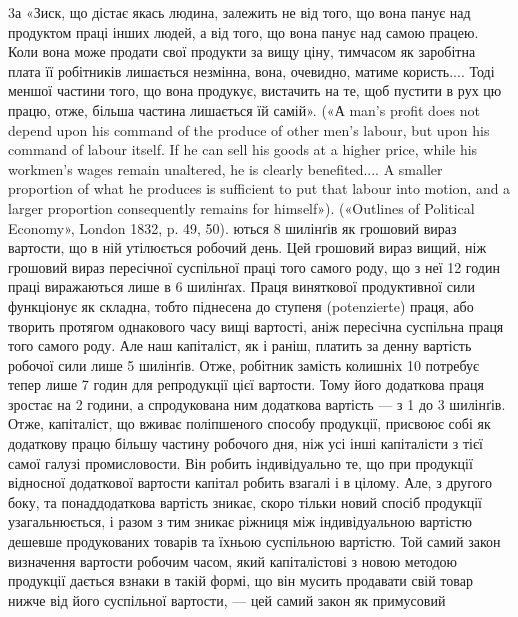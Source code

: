 3а «Зиск, що дістає якась людина, залежить не від того, що вона
панує над продуктом праці інших людей, а від того, що вона панує над
самою працею. Коли вона може продати свої продукти за вищу ціну, тимчасом
як заробітна плата її робітників лишається незмінна, вона, очевидно,
матиме користь.... Тоді меншої частини того, що вона продукує, вистачить
на те, щоб пустити в рух цю працю, отже, більша частина лишається їй
самій». («А man’s profit does not depend upon his command of the produce
of other men’s labour, but upon his command of labour itself. If he can sell
his goods at a higher price, while his workmen's wages remain unaltered,
he is clearly benefited.... A smaller proportion of what he produces is sufficient
to put that labour into motion, and a larger proportion consequently
remains for himself»). («Outlines of Political Economy», London 1832,
p. 49, 50).
ються 8 шилінґів як грошовий вираз вартости, що в ній утілюється робочий день. Цей грошовий вираз
вищий, ніж грошовий
вираз пересічної суспільної праці того самого роду, що з неї
12 годин праці виражаються лише в 6 шилінґах. Праця виняткової продуктивної сили функціонує як
складна, тобто піднесена
до ступеня (potenzierte) праця, або творить протягом однакового
часу вищі вартості, аніж пересічна суспільна праця того самого
роду. Але наш капіталіст, як і раніш, платить за денну вартість
робочої сили лише 5 шилінґів. Отже, робітник замість колишніх
10 потребує тепер лише 7 годин для репродукції цієї вартости.
Тому його додаткова праця зростає на 2 години, а спродукована
ним додаткова вартість — з 1 до 3 шилінґів. Отже, капіталіст,
що вживає поліпшеного способу продукції, присвоює собі як додаткову працю більшу частину робочого
дня, ніж усі інші капіталісти
з тієї самої галузі промисловости. Він робить індивідуально те,
що при продукції відносної додаткової вартости капітал робить
взагалі і в цілому. Але, з другого боку, та понаддодаткова вартість
зникає, скоро тільки новий спосіб продукції узагальнюється, і
разом з тим зникає ріжниця між індивідуальною вартістю дешевше
продукованих товарів та їхньою суспільною вартістю. Той самий
закон визначення вартости робочим часом, який капіталістові
з новою методою продукції дається взнаки в такій формі, що він
мусить продавати свій товар нижче від його суспільної вартости, — цей самий закон як примусовий
